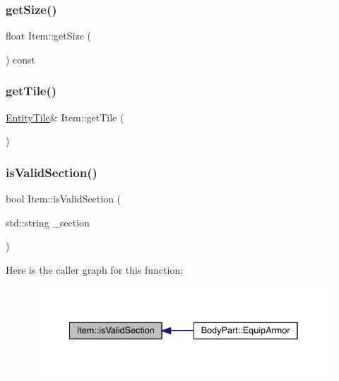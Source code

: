 \mbox{\label{class_item_a2a84b0b0b25d4d1e8bb1b456d8094b84}} 
\subsubsection{\texorpdfstring{get\+Size()}{getSize()}}
{\footnotesize\ttfamily float Item\+::get\+Size (\begin{DoxyParamCaption}{ }\end{DoxyParamCaption}) const}

\mbox{\label{class_item_a61272a187be1a07a49685cbee45d30bd}} 
\subsubsection{\texorpdfstring{get\+Tile()}{getTile()}}
{\footnotesize\ttfamily \mbox{\hyperlink{class_entity_tile}{Entity\+Tile}}\& Item\+::get\+Tile (\begin{DoxyParamCaption}{ }\end{DoxyParamCaption})}

\mbox{\label{class_item_a10dd503844c230e3d3bf890e969af867}} 
\subsubsection{\texorpdfstring{is\+Valid\+Section()}{isValidSection()}}
{\footnotesize\ttfamily bool Item\+::is\+Valid\+Section (\begin{DoxyParamCaption}\item[{std\+::string}]{\+\_\+section }\end{DoxyParamCaption})}

Here is the caller graph for this function\+:
\nopagebreak
\begin{figure}[H]
\begin{center}
\leavevmode
\includegraphics[width=335pt]{dc/d32/class_item_a10dd503844c230e3d3bf890e969af867_icgraph}
\end{center}
\end{figure}
\mbox{\label{class_item_a612c595b62d2f7b9c5cd2b085a14b365}} 
